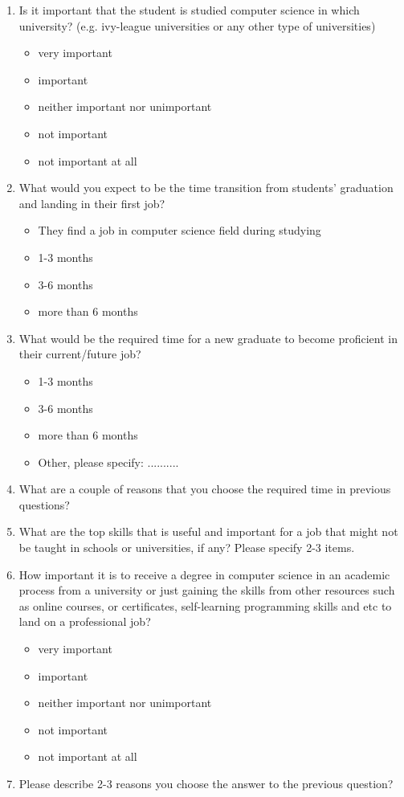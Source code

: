 \documentclass[12pt,a4paper,titlepage]{article}
\begin{document}
\begin{enumerate}
	\item Is it important that the student is studied computer science in which university? (e.g. ivy-league universities or any other type of universities)
	\begin{itemize}
		\item very important
		\item important
		\item neither important nor unimportant
		\item not important
		\item not important at all
	\end{itemize} 

	\item What would you expect to be the time transition from students’ graduation and landing in their first job?
	\begin{itemize}
		\item They find a job in computer science field during studying
		\item 1-3 months
		\item 3-6 months
		\item more than 6 months
	\end{itemize}

	\item What would be the required time for a new graduate to become proficient in their current/future job?
	\begin{itemize}
		\item 1-3 months
		\item 3-6 months
		\item more than 6 months
		\item Other, please specify: ..........
	\end{itemize}


	\item What are a couple of reasons that you choose the required time in previous questions?

	\item What are the top skills that is useful and important for a job that might not be taught in schools or universities, if any? Please specify 2-3 items.

	\item How important it is to receive a degree in computer science in an academic process from a university or just gaining the skills from other resources such as online courses, or certificates, self-learning programming skills and etc to land on a professional job?
	\begin{itemize}
		\item very important
		\item important
		\item neither important nor unimportant
		\item not important
		\item not important at all
	\end{itemize} 

	\item Please describe 2-3 reasons  you choose the answer to the previous question?

\end{enumerate}
\end{document}
